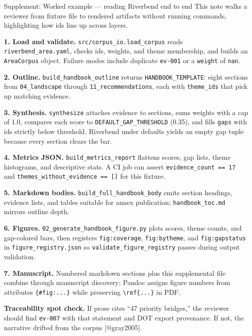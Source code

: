 \documentclass[
  ignorenonframetext,
]{beamer}
\author{\texorpdfstring{}{}}
\date{}
\begin{document}
\begin{frame}[fragile]{Supplement: Worked example --- reading Riverbend
end to end}
\protect{}\label{supplement-worked-example-reading-riverbend-end-to-end}
This note walks a reviewer from fixture file to rendered artifacts
without running commands, highlighting how ids line up across layers.

\textbf{1. Load and validate.} \texttt{src/corpus\_io.load\_corpus}
reads \texttt{riverbend\_area.yaml}, checks ids, weights, and theme
membership, and builds an \texttt{AreaCorpus} object. Failure modes
include duplicate \texttt{ev-001} or a \texttt{weight} of \texttt{nan}.

\textbf{2. Outline.} \texttt{build\_handbook\_outline} returns
\texttt{HANDBOOK\_TEMPLATE}: eight sections from \texttt{04\_landscape}
through \texttt{11\_recommendations}, each with \texttt{theme\_ids} that
pick up matching evidence.

\textbf{3. Synthesis.} \texttt{synthesize} attaches evidence to
sections, sums weights with a cap of \(1.0\), compares each score to
\texttt{DEFAULT\_GAP\_THRESHOLD} (0.35), and fills \texttt{gaps} with
ids strictly below threshold. Riverbend under defaults yields an empty
gap tuple because every section clears the bar.

\textbf{4. Metrics JSON.} \texttt{build\_metrics\_report} flattens
scores, gap lists, theme histograms, and descriptive stats. A CI job can
assert \texttt{evidence\_count\ ==\ 17} and
\texttt{themes\_without\_evidence\ ==\ {[}{]}} for this fixture.

\textbf{5. Markdown bodies.} \texttt{build\_full\_handbook\_body} emits
section headings, evidence lists, and tables suitable for annex
publication; \texttt{handbook\_toc.md} mirrors outline depth.

\textbf{6. Figures.} \texttt{02\_generate\_handbook\_figure.py} plots
scores, theme counts, and gap-colored bars, then registers
\texttt{fig:coverage}, \texttt{fig:bytheme}, and \texttt{fig:gapstatus}
in \texttt{figure\_registry.json} so \texttt{validate\_figure\_registry}
passes during output validation.

\textbf{7. Manuscript.} Numbered markdown sections plus this
supplemental file combine through manuscript discovery; Pandoc assigns
figure numbers from attributes \texttt{\{\#fig:...\}} while preserving
\texttt{\textbackslash{}ref\{...\}} in PDF.

\textbf{Traceability spot check.} If prose cites ``47 priority
bridges,'' the reviewer should find \texttt{ev-007} with that statement
and DOT export provenance. If not, the narrative drifted from the corpus
{[}@gray2005{]}.
\end{frame}
\end{document}
